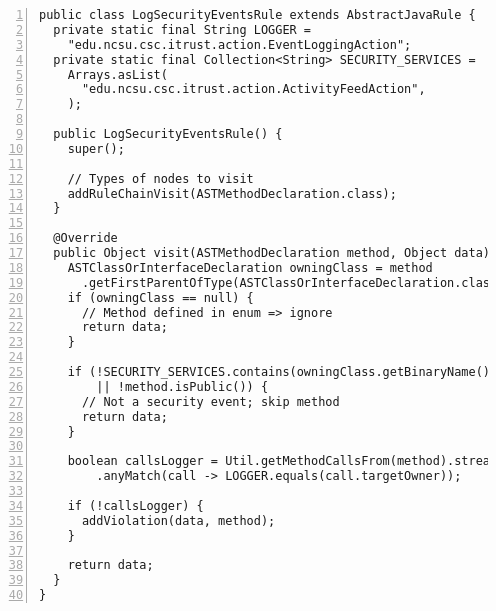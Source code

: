\begin{lstlisting}[caption={Constraint 1.}, captionpos=b, label=lst:pmd_1, numbers=left, showstringspaces=false]
public class LogSecurityEventsRule extends AbstractJavaRule {
  private static final String LOGGER =
    "edu.ncsu.csc.itrust.action.EventLoggingAction";
  private static final Collection<String> SECURITY_SERVICES =
    Arrays.asList(
      "edu.ncsu.csc.itrust.action.ActivityFeedAction",
    );

  public LogSecurityEventsRule() {
    super();

    // Types of nodes to visit
    addRuleChainVisit(ASTMethodDeclaration.class);
  }

  @Override
  public Object visit(ASTMethodDeclaration method, Object data) {
    ASTClassOrInterfaceDeclaration owningClass = method
      .getFirstParentOfType(ASTClassOrInterfaceDeclaration.class);
    if (owningClass == null) {
      // Method defined in enum => ignore
      return data;
    }

    if (!SECURITY_SERVICES.contains(owningClass.getBinaryName())
        || !method.isPublic()) {
      // Not a security event; skip method
      return data;
    }

    boolean callsLogger = Util.getMethodCallsFrom(method).stream()
        .anyMatch(call -> LOGGER.equals(call.targetOwner));

    if (!callsLogger) {
      addViolation(data, method);
    }

    return data;
  }
}
\end{lstlisting}

